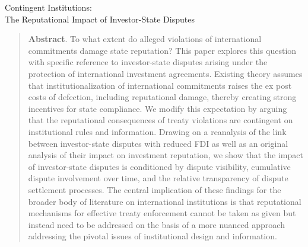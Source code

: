 \documentclass[12pt,onesided]{amsart}
\begin{document}
\thispagestyle{empty}

\begin{center}
{\sc \large Contingent Institutions: \\ The Reputational Impact of Investor-State Disputes}
\end{center}



\vspace{20mm}

\begin{quote}
\noindent \textbf{Abstract}. To what extent do alleged violations of international commitments damage state reputation? This paper explores this question with specific reference to investor-state disputes arising under the protection of international investment agreements. Existing theory assumes that institutionalization of international commitments raises the ex post costs of defection, including reputational damage, thereby creating strong incentives for state compliance. We modify this expectation by arguing that the reputational consequences of treaty violations are contingent on institutional rules and information. Drawing on a reanalysis of the link between investor-state disputes with reduced FDI as well as an original analysis of their impact on investment reputation, we show that the impact of investor-state disputes is conditioned by dispute visibility, cumulative dispute involvement over time, and the relative transparency of dispute settlement processes. The central implication of these findings for the broader body of literature on international institutions is that reputational mechanisms for effective treaty enforcement cannot be taken as given but instead need to be addressed on the basis of a more nuanced approach addressing the pivotal issues of institutional design and information.
\end{quote}
 
\vspace{10mm}
\end{document}
